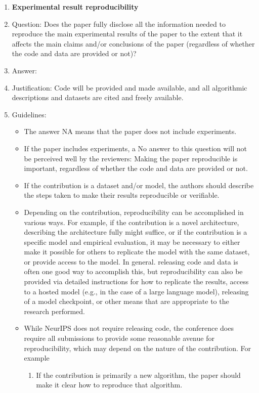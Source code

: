 \documentclass{article}
\theoremstyle{plain}
\theoremstyle{definition}
\theoremstyle{remark}
\begin{document}
\begin{enumerate}
    \item {\bf Experimental result reproducibility}
    \item[] Question: Does the paper fully disclose all the information needed to reproduce the main experimental results of the paper to the extent that it affects the main claims and/or conclusions of the paper (regardless of whether the code and data are provided or not)?
    \item[] Answer: \answerYes{} %
    \item[] Justification: Code will be provided and made available, and all algorithmic descriptions and datasets are cited and freely available.
    \item[] Guidelines:
    \begin{itemize}
        \item The answer NA means that the paper does not include experiments.
        \item If the paper includes experiments, a No answer to this question will not be perceived well by the reviewers: Making the paper reproducible is important, regardless of whether the code and data are provided or not.
        \item If the contribution is a dataset and/or model, the authors should describe the steps taken to make their results reproducible or verifiable. 
        \item Depending on the contribution, reproducibility can be accomplished in various ways. For example, if the contribution is a novel architecture, describing the architecture fully might suffice, or if the contribution is a specific model and empirical evaluation, it may be necessary to either make it possible for others to replicate the model with the same dataset, or provide access to the model. In general. releasing code and data is often one good way to accomplish this, but reproducibility can also be provided via detailed instructions for how to replicate the results, access to a hosted model (e.g., in the case of a large language model), releasing of a model checkpoint, or other means that are appropriate to the research performed.
        \item While NeurIPS does not require releasing code, the conference does require all submissions to provide some reasonable avenue for reproducibility, which may depend on the nature of the contribution. For example
        \begin{enumerate}
            \item If the contribution is primarily a new algorithm, the paper should make it clear how to reproduce that algorithm.

\end{enumerate}
\end{itemize}
\end{enumerate}
\end{document}
